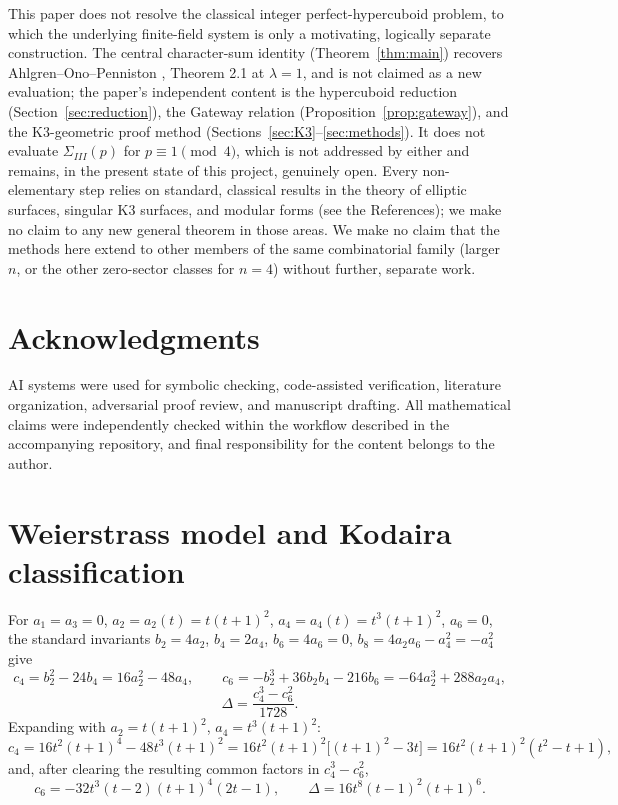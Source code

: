 \documentclass[11pt]{amsart}
\theoremstyle{definition}
\begin{document}
This paper does not resolve the classical integer perfect-hypercuboid problem, to which the underlying finite-field system is only a motivating, logically separate construction. The central character-sum identity (Theorem~\ref{thm:main}) recovers Ahlgren--Ono--Penniston \cite{AOP2002}, Theorem 2.1 at $\lambda=1$, and is not claimed as a new evaluation; the paper's independent content is the hypercuboid reduction (Section~\ref{sec:reduction}), the Gateway relation (Proposition~\ref{prop:gateway}), and the K3-geometric proof method (Sections~\ref{sec:K3}--\ref{sec:methods}). It does not evaluate $\Sigma_{III}(p)$ for $p\equiv1\pmod4$, which is not addressed by \cite{AOP2002} either and remains, in the present state of this project, genuinely open. Every non-elementary step relies on standard, classical results in the theory of elliptic surfaces, singular K3 surfaces, and modular forms (see the References); we make no claim to any new general theorem in those areas. We make no claim that the methods here extend to other members of the same combinatorial family (larger $n$, or the other zero-sector classes for $n=4$) without further, separate work.

\section*{Acknowledgments}
AI systems were used for symbolic checking, code-assisted verification, literature organization, adversarial proof review, and manuscript drafting. All mathematical claims were independently checked within the workflow described in the accompanying repository, and final responsibility for the content belongs to the author.

\appendix

\section{Weierstrass model and Kodaira classification}
\label{app:kodaira}

For $a_1=a_3=0$, $a_2=a_2(t)=t(t+1)^2$, $a_4=a_4(t)=t^3(t+1)^2$, $a_6=0$, the standard invariants
$b_2=4a_2$, $b_4=2a_4$, $b_6=4a_6=0$, $b_8=4a_2a_6-a_4^2=-a_4^2$ give
\[
c_4=b_2^2-24b_4=16a_2^2-48a_4,\qquad c_6=-b_2^3+36b_2b_4-216b_6=-64a_2^3+288a_2a_4,
\]
\[
\Delta=\frac{c_4^3-c_6^2}{1728}.
\]
Expanding with $a_2=t(t+1)^2$, $a_4=t^3(t+1)^2$:
\[
c_4=16t^2(t+1)^4-48t^3(t+1)^2=16t^2(t+1)^2\bigl[(t+1)^2-3t\bigr]=16t^2(t+1)^2(t^2-t+1),
\]
and, after clearing the resulting common factors in $c_4^3-c_6^2$,
\[
c_6=-32t^3(t-2)(t+1)^4(2t-1),\qquad \Delta=16t^8(t-1)^2(t+1)^6.
\]
\end{document}
